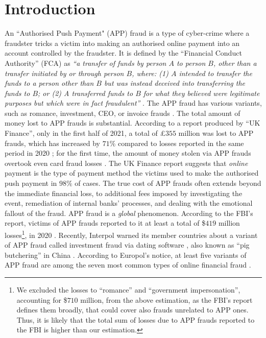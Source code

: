 

\section{Introduction}\label{sec::intro}

An  ``Authorised Push Payment" (APP) fraud is a type of cyber-crime where a fraudster tricks a victim into making an authorised online payment into an account controlled by the fraudster. It is defined by the ``Financial Conduct Authority” (FCA) as \textit{``a transfer of funds by person $A$ to person $B$, other than a transfer initiated by or through person $B$, where: (1) $A$ intended to transfer the funds to a person other than $B$ but was instead deceived into transferring the funds to $B$; or (2) A transferred funds to $B$ for what they believed were legitimate purposes but which were in fact fraudulent''} \cite{FCA-Glossary}. The APP fraud has various variants, such as romance, investment, CEO, or invoice frauds \cite{overview-of-payment-fraud}. 
%
The total amount of money lost to  APP frauds is substantial. According to a report produced by ``UK Finance'',   only in the first half of 2021, a total of £$355$ million was lost to APP frauds, which has increased by  $71\%$  compared to losses reported in the same period in 2020 \cite{2021-Half-Year-Fraud-Update}; for the first time, the amount of money stolen via  APP frauds overtook even card fraud losses \cite{2021-Half-Year-Fraud-Update}. The UK Finance report suggests that \emph{online} payment is the type of payment method the victims used to make the authorised push payment in  $98\%$  of cases.
%
 The true cost of APP frauds often extends beyond the immediate financial loss,  to additional fees imposed by investigating the event, remediation of internal banks' processes, and dealing with the emotional fallout of the fraud.  APP fraud is a \emph{global} phenomenon. According to the FBI's report, victims of APP frauds reported to it at least a total of  \$$419$ million losses\footnote{We excluded the losses to ``romance'' and ``government impersonation'', accounting for \$$710$ million, from the above estimation, as the FBI's report defines them  broadly, that could cover also frauds unrelated to APP ones. Thus, it is likely that the total sum of losses due to APP frauds reported to the FBI is higher than our estimation.}, in 2020 \cite{internet-crime-report}. Recently, Interpol warned its member countries about a variant of APP fraud called investment fraud via dating software \cite{interpol-notce}, also known as ``pig butchering'' in China  \cite{pig-butchering}. According to  Europol’s notice, at least five variants of APP fraud are among the seven most common types of online financial fraud \cite{europol-notice}. 






